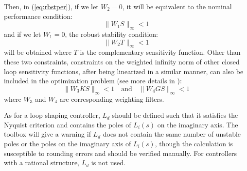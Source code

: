 \documentclass [12pt , a4paper] {report}
\begin{document}
Then, in (\ref{eq:rbstper}), if we let $W_2=0$, it will be equivalent to the nominal performance condition: 
\begin{equation}
\label{eq:nomper}
\|W_1S\|_\infty<1
\end{equation}
and if we let $W_1=0$, the robust stability condition:
\begin{equation}
\label{eq:rbststab}
\|W_2T\|_\infty<1
\end{equation}
 will be obtained where $T$ is the complementary sensitivity function. Other than these two constraints, constraints on the weighted infinity norm of other closed loop sensitivity functions, after being linearized in a similar manner, can also be included in the optimization problem (see more details in \cite{KG10}):
\begin{equation}
\label{eq:W3W4}
\|W_3KS\|_\infty<1 \quad \mbox{and} \quad \|W_4GS\|_\infty<1 
\end{equation}
where $W_3$ and $W_4$ are corresponding weighting filters.


As for a loop shaping controller, $L_d$ should be defined such that it satisfies the Nyquist criterion and contains the poles of $L_i(s)$ on the imaginary axis. The toolbox will give a warning if $L_d$ does not contain the same number of unstable poles or the poles on the imaginary axis of $L_i(s)$, though the calculation is susceptible to rounding errors and should be verified manually. For controllers with a rational structure, $L_d$ is not used.
\end{document}
